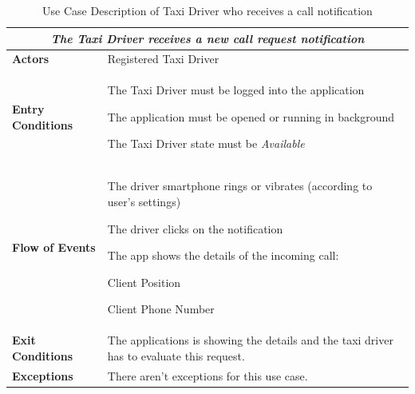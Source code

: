 \documentclass[a4paper]{article}
\begin{document}
\begin{table} [H]
\begin{center}
\begin{tabular}{ |m{}|m{}|  }
\hline
    \multicolumn{2}{|c|}{\textbf{\textit{The Taxi Driver receives a new call request notification}}} \\
\hline \hline
    \textbf{Actors}
&   Registered Taxi Driver
\\ \hline
    \textbf{Entry Conditions}
&   
    \begin{itemize*}
    \item The Taxi Driver must be logged into the application
    \item The application must be opened or running in background
    \item The Taxi Driver state must be \emph{Available}
    \end{itemize*}
\\ \hline
    \textbf{Flow of Events}
& 
    \begin{enumerate*}
    \item The driver smartphone rings or vibrates (according to user's settings)
    \item The driver clicks on the notification
    \item The app shows the details of the incoming call:
        \begin{itemize*}
        \item Client Position
        \item Client Phone Number
        \end{itemize*}
    \end{enumerate*}
\\ \hline
    \textbf{Exit Conditions}
&  The applications is showing the details and the taxi driver has to evaluate this request.
\\ \hline
    \textbf{Exceptions}
&   There aren't exceptions for this use case.
\\ \hline
\end{tabular}
\end{center}
\caption{Use Case Description of Taxi Driver who receives a call notification}
\label{table:taxireceivenotification}
\end{table}
\end{document}
